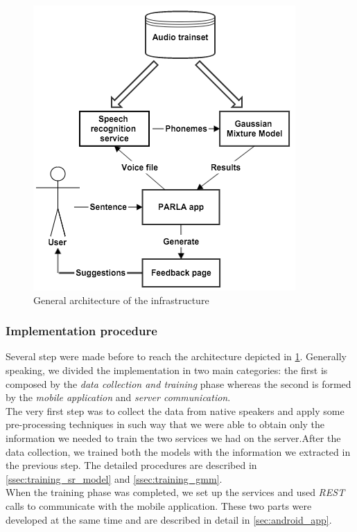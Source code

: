 \begin{figure}[!ht]
	\centering
	\includegraphics[scale=0.6]{Figures/general_architecture.png}
	\caption{General architecture of the infrastructure}
	\label{fig:general_architecture}
\end{figure}

\subsubsection{Implementation procedure}
\label{ssec:procedure}

Several step were made before to reach the architecture depicted in \ref{fig:general_architecture}. Generally speaking, we divided the implementation in two main categories: the first is composed by the \textit{data collection and training} phase whereas the second is formed by the \textit{mobile application} and \textit{server communication}. \\

\noindent The very first step was to collect the data from native speakers and apply some pre-processing techniques in such way that we were able to obtain only the information we needed to train the two services we had on the server.After the data collection, we trained both the models with the information we extracted in the previous step. The detailed procedures are described in \ref{ssec:training_sr_model} and \ref{ssec:training_gmm}. \\
\noindent When the training phase was completed, we set up the services and used \textit{REST} calls to communicate with the mobile application. These two parts were developed at the same time and are described in detail in \ref{sec:android_app}.


